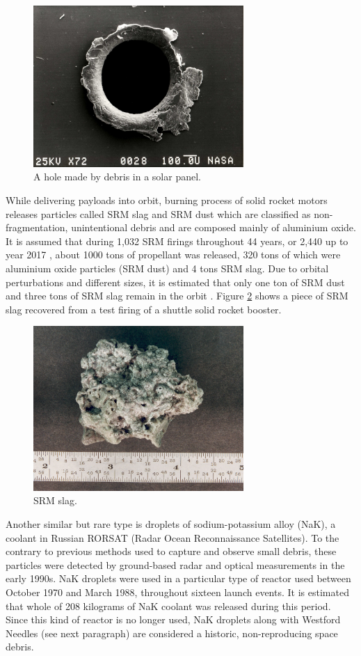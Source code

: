 \begin{figure}[H]
\centering
  \includegraphics[width=8cm]{images/hypervelocitycollision}
  \caption{A hole made by debris in a solar panel.}
  \label{fig:hypervelocitycollision}
\end{figure}	
	
	While delivering payloads into orbit, burning process of solid rocket motors releases particles called SRM slag and SRM dust which are classified as non-fragmentation, unintentional debris and are composed mainly of aluminium oxide. It is assumed that during 1,032 SRM firings throughout 44 years, or 2,440 up to year 2017 \citep{esabr336}, about 1000 tons of propellant was released, 320 tons of which were aluminium oxide particles (SRM dust) and 4 tons SRM slag. Due to orbital perturbations and different sizes, it is estimated that only one ton of SRM dust and three tons of SRM slag remain in the orbit \citep{klinkrad2006space}. Figure \ref{fig:srmslag} shows a piece of SRM slag recovered from a test firing of a shuttle solid rocket booster.
	
\begin{figure}[H]
\centering
  \includegraphics[width=8cm]{images/slag}
  \caption{SRM slag.}
  \label{fig:srmslag}
\end{figure}	
	
	Another similar but rare type is droplets of sodium-potassium alloy (NaK), a coolant in Russian RORSAT (Radar Ocean Reconnaissance Satellites). To the contrary to previous methods used to capture and observe small debris, these particles were detected by ground-based radar and optical measurements in the early 1990s. NaK droplets were used in a particular type of reactor used between October 1970 and March 1988, throughout sixteen launch events. It is estimated that whole of 208 kilograms of NaK coolant was released during this period. Since this kind of reactor is no longer used, NaK droplets along with Westford Needles (see next paragraph) are considered a historic, non-reproducing space debris. 
	

